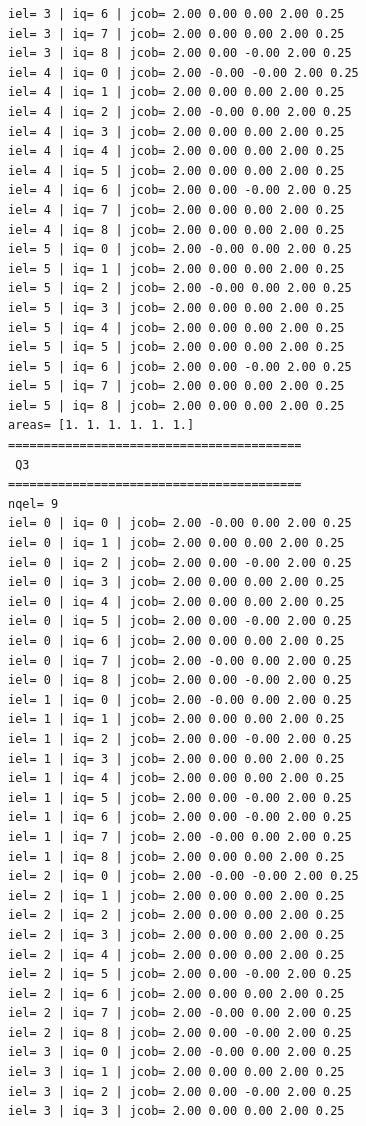 \begin{tiny}
\begin{verbatim}
iel= 3 | iq= 6 | jcob= 2.00 0.00 0.00 2.00 0.25
iel= 3 | iq= 7 | jcob= 2.00 0.00 0.00 2.00 0.25
iel= 3 | iq= 8 | jcob= 2.00 0.00 -0.00 2.00 0.25
iel= 4 | iq= 0 | jcob= 2.00 -0.00 -0.00 2.00 0.25
iel= 4 | iq= 1 | jcob= 2.00 0.00 0.00 2.00 0.25
iel= 4 | iq= 2 | jcob= 2.00 -0.00 0.00 2.00 0.25
iel= 4 | iq= 3 | jcob= 2.00 0.00 0.00 2.00 0.25
iel= 4 | iq= 4 | jcob= 2.00 0.00 0.00 2.00 0.25
iel= 4 | iq= 5 | jcob= 2.00 0.00 0.00 2.00 0.25
iel= 4 | iq= 6 | jcob= 2.00 0.00 -0.00 2.00 0.25
iel= 4 | iq= 7 | jcob= 2.00 0.00 0.00 2.00 0.25
iel= 4 | iq= 8 | jcob= 2.00 0.00 0.00 2.00 0.25
iel= 5 | iq= 0 | jcob= 2.00 -0.00 0.00 2.00 0.25
iel= 5 | iq= 1 | jcob= 2.00 0.00 0.00 2.00 0.25
iel= 5 | iq= 2 | jcob= 2.00 -0.00 0.00 2.00 0.25
iel= 5 | iq= 3 | jcob= 2.00 0.00 0.00 2.00 0.25
iel= 5 | iq= 4 | jcob= 2.00 0.00 0.00 2.00 0.25
iel= 5 | iq= 5 | jcob= 2.00 0.00 0.00 2.00 0.25
iel= 5 | iq= 6 | jcob= 2.00 0.00 -0.00 2.00 0.25
iel= 5 | iq= 7 | jcob= 2.00 0.00 0.00 2.00 0.25
iel= 5 | iq= 8 | jcob= 2.00 0.00 0.00 2.00 0.25
areas= [1. 1. 1. 1. 1. 1.]
=========================================
 Q3
=========================================
nqel= 9
iel= 0 | iq= 0 | jcob= 2.00 -0.00 0.00 2.00 0.25
iel= 0 | iq= 1 | jcob= 2.00 0.00 0.00 2.00 0.25
iel= 0 | iq= 2 | jcob= 2.00 0.00 -0.00 2.00 0.25
iel= 0 | iq= 3 | jcob= 2.00 0.00 0.00 2.00 0.25
iel= 0 | iq= 4 | jcob= 2.00 0.00 0.00 2.00 0.25
iel= 0 | iq= 5 | jcob= 2.00 0.00 -0.00 2.00 0.25
iel= 0 | iq= 6 | jcob= 2.00 0.00 0.00 2.00 0.25
iel= 0 | iq= 7 | jcob= 2.00 -0.00 0.00 2.00 0.25
iel= 0 | iq= 8 | jcob= 2.00 0.00 -0.00 2.00 0.25
iel= 1 | iq= 0 | jcob= 2.00 -0.00 0.00 2.00 0.25
iel= 1 | iq= 1 | jcob= 2.00 0.00 0.00 2.00 0.25
iel= 1 | iq= 2 | jcob= 2.00 0.00 -0.00 2.00 0.25
iel= 1 | iq= 3 | jcob= 2.00 0.00 0.00 2.00 0.25
iel= 1 | iq= 4 | jcob= 2.00 0.00 0.00 2.00 0.25
iel= 1 | iq= 5 | jcob= 2.00 0.00 -0.00 2.00 0.25
iel= 1 | iq= 6 | jcob= 2.00 0.00 -0.00 2.00 0.25
iel= 1 | iq= 7 | jcob= 2.00 -0.00 0.00 2.00 0.25
iel= 1 | iq= 8 | jcob= 2.00 0.00 0.00 2.00 0.25
iel= 2 | iq= 0 | jcob= 2.00 -0.00 -0.00 2.00 0.25
iel= 2 | iq= 1 | jcob= 2.00 0.00 0.00 2.00 0.25
iel= 2 | iq= 2 | jcob= 2.00 0.00 0.00 2.00 0.25
iel= 2 | iq= 3 | jcob= 2.00 0.00 0.00 2.00 0.25
iel= 2 | iq= 4 | jcob= 2.00 0.00 0.00 2.00 0.25
iel= 2 | iq= 5 | jcob= 2.00 0.00 -0.00 2.00 0.25
iel= 2 | iq= 6 | jcob= 2.00 0.00 0.00 2.00 0.25
iel= 2 | iq= 7 | jcob= 2.00 -0.00 0.00 2.00 0.25
iel= 2 | iq= 8 | jcob= 2.00 0.00 -0.00 2.00 0.25
iel= 3 | iq= 0 | jcob= 2.00 -0.00 0.00 2.00 0.25
iel= 3 | iq= 1 | jcob= 2.00 0.00 0.00 2.00 0.25
iel= 3 | iq= 2 | jcob= 2.00 0.00 -0.00 2.00 0.25
iel= 3 | iq= 3 | jcob= 2.00 0.00 0.00 2.00 0.25

\end{verbatim}
\end{tiny}

